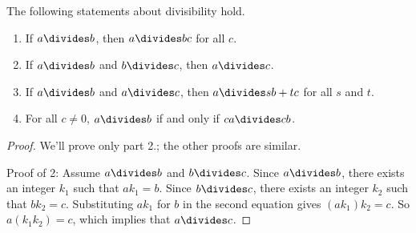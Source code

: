 \begin{lemma}
\label{lem:div}
The following statements about divisibility hold.
%
\begin{enumerate}
\item If $a \divides b$, then $a \divides bc$ for all $c$.
\item If $a \divides b$ and $b \divides c$, then $a \divides c$.

\item\label{lem:divsbtc} If $a \divides b$ and $a \divides c$,
then $a \divides sb + tc$ for all $s$ and $t$.

\item For all $c \neq 0$, $a \divides b$ if and only if $ca \divides cb$.
\end{enumerate}
\end{lemma}

\begin{proof}
We'll prove only part 2.; the other proofs are similar.

Proof of 2: Assume $a \divides b$ and $b \divides c$.
Since $a \divides b$, there exists an integer $k_1$ such
that $a k_1 = b$.  Since $b \divides c$, there exists an integer $k_2$
such that $b k_2=c$.  Substituting $a k_1$ for $b$ in the second
equation gives $(a k_1) k_2 = c$.  So $ a (k_1 k_2) = c$, which
implies that $a \divides c$.
\end{proof}

